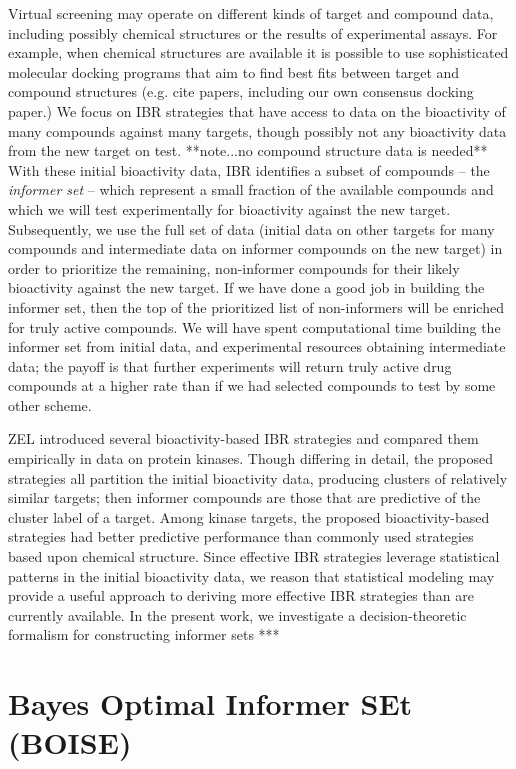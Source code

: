 \documentclass[12pt]{article}
\begin{document}
Virtual screening may operate on different kinds of target and compound data, including
possibly chemical structures or the results of experimental assays.   For example, when chemical structures are available
it is possible to use sophisticated molecular docking programs that aim to find best fits between target and compound
structures (e.g. cite papers, including our own consensus docking paper.)
We focus on IBR strategies that have access to data on the bioactivity of many compounds
against many targets, though possibly not any bioactivity data from 
the new target on test. **note...no compound structure data is needed**  With these initial bioactivity data, IBR  
identifies a subset of compounds -- the {\em informer set} -- which
represent a small fraction of the available compounds and which we
will test experimentally for bioactivity against the new target.  Subsequently, we use the full set of data (initial data on other targets
for many compounds and intermediate data on informer compounds on 
the new target) in order to prioritize the remaining, non-informer
compounds for their likely bioactivity against the new target.  If
we have done a good job in building the informer set, then the 
top of the prioritized list of non-informers will be enriched
for truly active compounds.  We will have spent computational time
building the informer set from initial data, and experimental resources
obtaining intermediate data; the payoff is that further experiments
will return truly active drug compounds at  a higher rate than
if we had selected compounds to test by some other scheme.

ZEL introduced several bioactivity-based IBR strategies and compared
them empirically in data on protein kinases. Though differing in detail,
the proposed strategies all partition the initial
bioactivity data, producing  clusters of relatively similar targets; 
then informer compounds are  those that are predictive of the cluster label of a target.  Among kinase targets, the proposed bioactivity-based strategies had better predictive
performance than commonly used strategies based upon chemical
structure.   Since effective IBR strategies leverage statistical
patterns in the initial bioactivity data, we reason that
statistical modeling may provide a useful approach to deriving
more effective IBR strategies than are currently available. 
In the present work, we investigate a decision-theoretic formalism for constructing informer sets ***

\section{Bayes Optimal Informer SEt (BOISE)}
\end{document}
